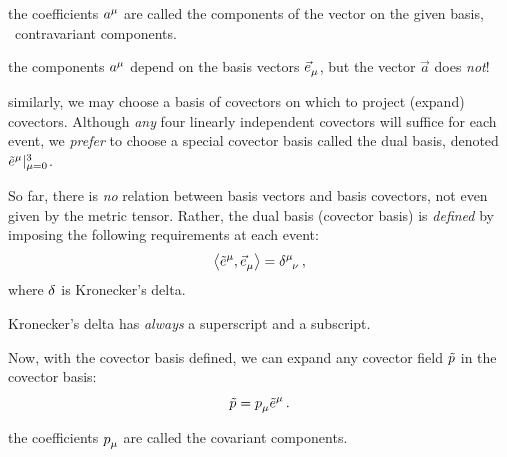  the coefficients $\tvec a\mu$ are called the components of the vector on the given basis, \aka\ contravariant components.

 the components $\tvec a\mu$ depend on the basis vectors $\tbvec\mu$, but the vector $\vec a$ does \emph{not}!

 similarly, we may choose a basis of covectors on which to project (expand) covectors. Although \emph{any} four linearly independent covectors will suffice for each event, we \emph{prefer} to choose a special covector basis called the dual basis, denoted $\bset{\tbcov\mu}{\mu = 0}{3}$.

 So far, there is \emph{no} relation between basis vectors and basis covectors, not even given by the metric tensor. Rather, the dual basis (covector basis) is \emph{defined} by imposing the following requirements at each event:
%
\begin{equation}\label{eq:relationbasisvecbasiscovec}
  \sprod{\tbcov\mu}{\tbvec\mu} = \tkron\mu\nu\,,
\end{equation}
%
where $\delta$ is Kronecker's delta.

 Kronecker's delta has \emph{always} a superscript and a subscript.

 Now, with the covector basis defined, we can expand any covector field $\tilde{p}$ in the covector basis:
%
\begin{equation}\label{eq:vectorprojectiononbasiscovecs}
  \cov p = \tcov p\mu\tbcov\mu\,.
\end{equation}

 the coefficients $\tcov p\mu$ are called the covariant components.

